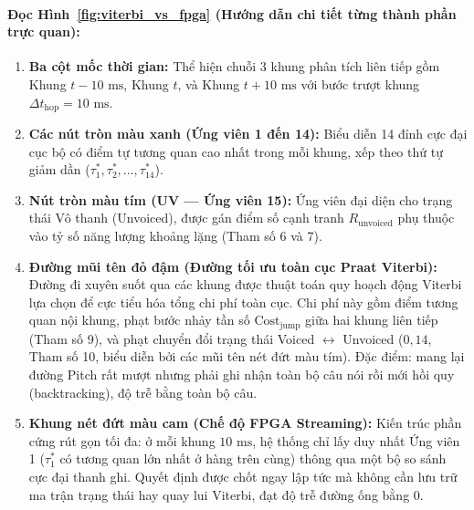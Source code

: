\documentclass[11pt,a4paper]{article}
\begin{document}
\paragraph{Đọc Hình~\ref{fig:viterbi_vs_fpga} (Hướng dẫn chi tiết từng thành phần trực quan):}
\begin{enumerate}
    \setlength{\itemsep}{1.5pt}
    \item \textbf{Ba cột mốc thời gian:} Thể hiện chuỗi 3 khung phân tích liên tiếp gồm Khung $t - 10\text{ ms}$, Khung $t$, và Khung $t + 10\text{ ms}$ với bước trượt khung $\Delta t_{\text{hop}} = 10\text{ ms}$.
    \item \textbf{Các nút tròn màu xanh (Ứng viên 1 đến 14):} Biểu diễn 14 đỉnh cực đại cục bộ có điểm tự tương quan cao nhất trong mỗi khung, xếp theo thứ tự giảm dần ($\tau_1^*, \tau_2^*, \dots, \tau_{14}^*$).
    \item \textbf{Nút tròn màu tím (UV --- Ứng viên 15):} Ứng viên đại diện cho trạng thái Vô thanh (Unvoiced), được gán điểm số cạnh tranh $R_{\text{unvoiced}}$ phụ thuộc vào tỷ số năng lượng khoảng lặng (Tham số 6 và 7).
    \item \textbf{Đường mũi tên đỏ đậm (Đường tối ưu toàn cục Praat Viterbi):} Đường đi xuyên suốt qua các khung được thuật toán quy hoạch động Viterbi lựa chọn để cực tiểu hóa tổng chi phí toàn cục. Chi phí này gồm điểm tương quan nội khung, phạt bước nhảy tần số $\text{Cost}_{\text{jump}}$ giữa hai khung liên tiếp (Tham số 9), và phạt chuyển đổi trạng thái Voiced $\leftrightarrow$ Unvoiced ($0{,}14$, Tham số 10, biểu diễn bởi các mũi tên nét đứt màu tím). Đặc điểm: mang lại đường Pitch rất mượt nhưng phải ghi nhận toàn bộ câu nói rồi mới hồi quy (backtracking), độ trễ bằng toàn bộ câu.
    \item \textbf{Khung nét đứt màu cam (Chế độ FPGA Streaming):} Kiến trúc phần cứng rút gọn tối đa: ở mỗi khung $10\text{ ms}$, hệ thống chỉ lấy duy nhất Ứng viên 1 ($\tau_1^*$ có tương quan lớn nhất ở hàng trên cùng) thông qua một bộ so sánh cực đại thanh ghi. Quyết định được chốt ngay lập tức mà không cần lưu trữ ma trận trạng thái hay quay lui Viterbi, đạt độ trễ đường ống bằng 0.
\end{enumerate}
\end{document}
